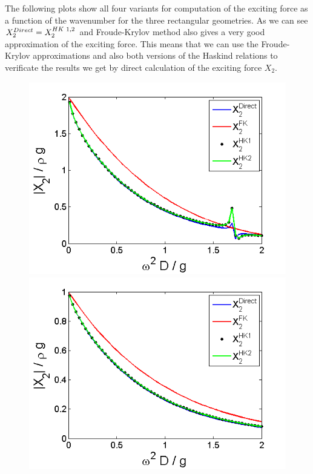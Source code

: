\documentclass[a4paper,10pt]{article}
\begin{document}
The following plots show all four variants for computation of the exciting force as a function of the wavenumber for the three rectangular geometries. As we can see $X_2^{Direct} = X_2^{HK \hspace{1mm} 1, 2}$ and Froude-Krylov method also gives a very good approximation of the exciting force. This means that we can use the Froude-Krylov approximations and also both versions of the Haskind relations to verificate the results we get by direct calculation of the exciting force $X_2$.

\begin{figure}[H]
  \includegraphics[width=\linewidth]{X2_2_box1.png}
  \caption{}\label{X2_2_box1}
\endminipage
{}
  \includegraphics[width=\linewidth]{X2_2_box2.png}

\end{figure}
\end{document}
